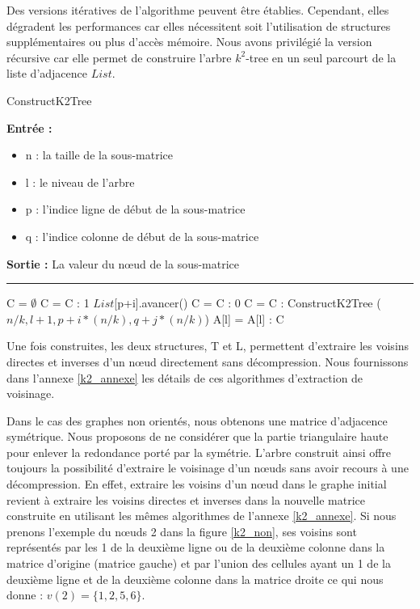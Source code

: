 \documentclass[a4paper,oneside,12pt]{report}
\theoremstyle{definition}
\begin{document}
Des versions itératives de l'algorithme peuvent être établies. Cependant, elles dégradent les performances car elles nécessitent soit l'utilisation de structures supplémentaires ou plus d'accès mémoire. Nous avons privilégié la version récursive car elle permet de construire l'arbre $k^2$-tree en un seul parcourt de la liste d'adjacence $List$.
					\begin{algorithm}[H]
					\label{alg:k2_tree}
					\caption{ConstructK2Tree}
					\textbf{Entrée :}
						\begin{itemize}[label=$\bullet$]
							\item n : la taille de la sous-matrice
							\item l : le niveau de l'arbre
							\item p : l'indice ligne de début de la sous-matrice
							\item q : l'indice colonne de début de la sous-matrice
						\end{itemize}
					\textbf{Sortie :} La valeur du nœud de la sous-matrice\\							\noindent\rule{\textwidth}{1pt}
						
						
				\begin{algorithmic} [1]
					\STATE C = $ \emptyset$
									\STATE C = C : 1
									\STATE $List$[p+i].avancer()
								\ELSE
									\STATE C = C : 0
								\ENDIF
							\ELSE
								\STATE  C = C : ConstructK2Tree ( $n/k,l+1,p+i*(n/k), q+j*(n/k)$)
							\ENDIF
						\ENDFOR
					\ENDFOR
					\ENDIF
					\STATE A[l] = A[l] : C
				\end{algorithmic}
			\end{algorithm}
			
	Une fois construites, les deux structures, T et L, permettent d'extraire les voisins directes et inverses d'un nœud directement sans décompression. Nous fournissons dans l'annexe \ref{k2_annexe} les détails de ces  algorithmes d'extraction de voisinage.		
			
			
	Dans le cas des graphes non orientés, nous obtenons une matrice d'adjacence symétrique. Nous proposons de ne considérer que la partie triangulaire haute pour enlever la redondance porté par la symétrie. L'arbre construit ainsi offre toujours la possibilité d'extraire le voisinage d'un nœuds sans avoir recours à une décompression. En effet, extraire les voisins d'un nœud dans le graphe initial revient à extraire les voisins directes et inverses dans la nouvelle matrice construite en utilisant les mêmes algorithmes de l'annexe \ref{k2_annexe}.
	 Si nous prenons l'exemple du nœuds 2 dans la figure \ref{k2_non}, ses voisins sont représentés par les 1 de la deuxième ligne ou de la deuxième colonne dans la matrice d'origine (matrice gauche) et par l'union des cellules ayant un 1 de la deuxième ligne et de la deuxième colonne dans la matrice droite ce qui nous donne : $v(2) = \{1, 2, 5,6\}$.
	
\end{document}
